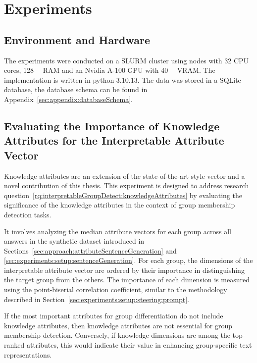 \chapter{Experiments}
\label{sec:experiments}


\section{Environment and Hardware}
\label{sec:experiments:environmentHardware}
The experiments were conducted on a SLURM cluster using nodes with \num{32} CPU cores, \SI{128}{\giga\byte} RAM and an Nvidia A-100 GPU with \SI{40}{\giga\byte} VRAM. The implementation is written in python 3.10.13. The data was stored in a SQLite database, the database schema can be found in Appendix~\ref{sec:appendix:databaseSchema}.





\section{Evaluating the Importance of Knowledge Attributes for the Interpretable Attribute Vector}%
\label{sec:experiments:knowledgeAttributes}
Knowledge attributes are an extension of the state-of-the-art style vector and a novel contribution of this thesis. This experiment is designed to address research question~\ref{rq:interpretableGroupDetect:knowledgeAttributes} by evaluating the significance of the knowledge attributes in the context of group membership detection tasks.

It involves analyzing the median attribute vectors for each group across all answers in the synthetic dataset introduced in Sections~\ref{sec:approach:attributeSentenceGeneration} and \ref{sec:experiments:setup:sentenceGeneration}. For each group, the dimensions of the interpretable attribute vector are ordered by their importance in distinguishing the target group from the others. The importance of each dimension is measured using the point-biserial correlation coefficient, similar to the methodology described in Section~\ref{sec:experiments:setup:steering:prompt}.

If the most important attributes for group differentiation do not include knowledge attributes, then knowledge attributes are not essential for group membership detection. Conversely, if knowledge dimensions are among the top-ranked attributes, this would indicate their value in enhancing group-specific text representations.


